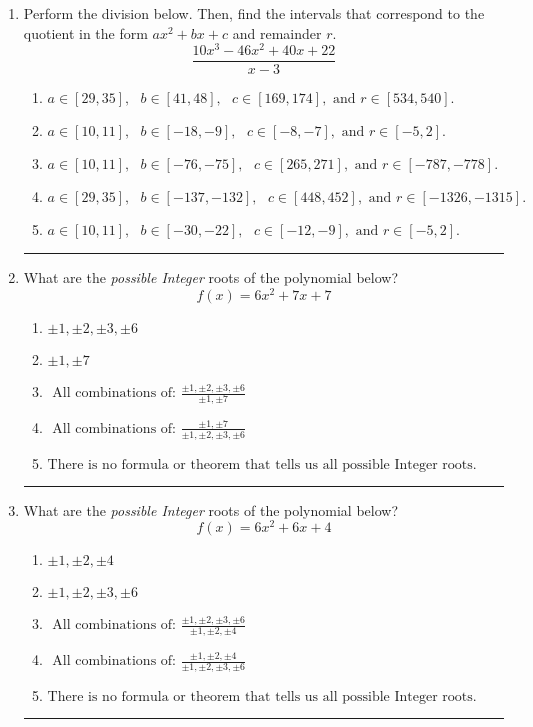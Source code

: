 \documentclass[14pt]{extbook}
\newcommand{\litem}[1]{\item#1\hspace*{-1cm}\rule{\textwidth}{0.4pt}}
\begin{document}
\begin{enumerate}
{\begin{enumerate}[label=\Alph*.]
\end{enumerate} }
\litem{
Perform the division below. Then, find the intervals that correspond to the quotient in the form $ax^2+bx+c$ and remainder $r$.\[ \frac{10x^{3} -46 x^{2} +40 x + 22}{x -3} \]\begin{enumerate}[label=\Alph*.]
\item \( a \in [29, 35], \text{   } b \in [41, 48], \text{   } c \in [169, 174], \text{   and   } r \in [534, 540]. \)
\item \( a \in [10, 11], \text{   } b \in [-18, -9], \text{   } c \in [-8, -7], \text{   and   } r \in [-5, 2]. \)
\item \( a \in [10, 11], \text{   } b \in [-76, -75], \text{   } c \in [265, 271], \text{   and   } r \in [-787, -778]. \)
\item \( a \in [29, 35], \text{   } b \in [-137, -132], \text{   } c \in [448, 452], \text{   and   } r \in [-1326, -1315]. \)
\item \( a \in [10, 11], \text{   } b \in [-30, -22], \text{   } c \in [-12, -9], \text{   and   } r \in [-5, 2]. \)

\end{enumerate} }
\litem{
What are the \textit{possible Integer} roots of the polynomial below?\[ f(x) = 6x^{2} +7 x + 7 \]\begin{enumerate}[label=\Alph*.]
\item \( \pm 1,\pm 2,\pm 3,\pm 6 \)
\item \( \pm 1,\pm 7 \)
\item \( \text{ All combinations of: }\frac{\pm 1,\pm 2,\pm 3,\pm 6}{\pm 1,\pm 7} \)
\item \( \text{ All combinations of: }\frac{\pm 1,\pm 7}{\pm 1,\pm 2,\pm 3,\pm 6} \)
\item \( \text{There is no formula or theorem that tells us all possible Integer roots.} \)

\end{enumerate} }
\litem{
What are the \textit{possible Integer} roots of the polynomial below?\[ f(x) = 6x^{2} +6 x + 4 \]\begin{enumerate}[label=\Alph*.]
\item \( \pm 1,\pm 2,\pm 4 \)
\item \( \pm 1,\pm 2,\pm 3,\pm 6 \)
\item \( \text{ All combinations of: }\frac{\pm 1,\pm 2,\pm 3,\pm 6}{\pm 1,\pm 2,\pm 4} \)
\item \( \text{ All combinations of: }\frac{\pm 1,\pm 2,\pm 4}{\pm 1,\pm 2,\pm 3,\pm 6} \)
\item \( \text{There is no formula or theorem that tells us all possible Integer roots.} \)


\end{enumerate}}
\end{enumerate}
\end{document}
